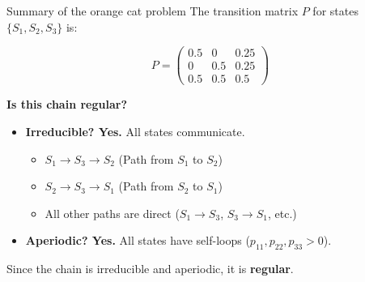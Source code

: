 \documentclass[aspectratio=169]{beamer}\usepackage[]{graphicx}\usepackage[]{xcolor}
\begin{document}
\begin{frame}{Summary of the orange cat problem}
    The transition matrix $P$ for states $\{S_1, S_2, S_3\}$ is:
    
    $$
    P = 
    \begin{pmatrix}
    0.5 & 0 & 0.25 \\
    0 & 0.5 & 0.25 \\
    0.5 & 0.5 & 0.5
    \end{pmatrix}
    $$
    
    \vfill
    
    \textbf{Is this chain regular?}
    \begin{itemize}
        \item \textbf{Irreducible? Yes.} All states communicate.
            \begin{itemize}
                \item $S_1 \to S_3 \to S_2$ (Path from $S_1$ to $S_2$)
                \item $S_2 \to S_3 \to S_1$ (Path from $S_2$ to $S_1$)
                \item All other paths are direct ($S_1 \to S_3$, $S_3 \to S_1$, etc.)
            \end{itemize}
        \item \textbf{Aperiodic? Yes.} All states have self-loops ($p_{11}, p_{22}, p_{33} > 0$).
    \end{itemize}
    \vfill
    Since the chain is irreducible and aperiodic, it is \textbf{regular}.
\end{frame}
\end{document}
